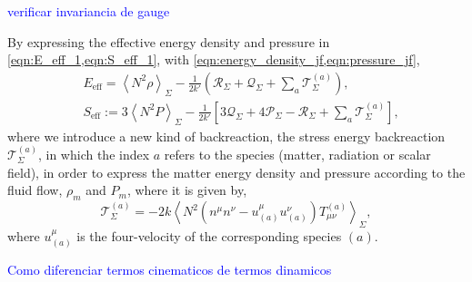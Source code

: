 \textcolor{blue}{verificar invariancia de gauge}







By expressing the effective energy density and pressure in \cref{eqn:E_eff_1,eqn:S_eff_1}, with \cref{eqn:energy_density_jf,eqn:pressure_jf},
\begin{align}
    &E_{\mathrm{eff}} = \left\langle N^2 \rho\right\rangle_{\Sigma}-\frac{1}{2k'}\left(\mathcal{R}_\Sigma+\mathcal{Q}_{\Sigma}+\sum_a \mathcal{T}^{(a)}_{\Sigma}\right),\\
    &S_{\mathrm{eff}}:=3\left\langle N^2 P\right\rangle_{\Sigma}-\frac{1}{2k'}\left[3\mathcal{Q}_{\Sigma}+4\mathcal{P}_{\Sigma}-\mathcal{R}_\Sigma+\sum_a\mathcal{T}^{(a)}_{\Sigma}\right],
\end{align}
where we introduce a new kind of backreaction, the stress energy backreaction $\mathcal{T}^{(a)}_\Sigma$, in which the index $a$ refers to the species (matter, radiation or scalar field), in order to express the matter energy density and pressure according to the fluid flow, $\rho_m$ and $P_m$, where it is given by,
\begin{equation}
    \mathcal{T}^{(a)}_{\Sigma}=-2k\left\langle N^2\left(n^\mu n^\nu-u^\mu_{(a)} u^\nu_{(a)}\right)T_{\mu\nu}^{(a)}\right\rangle_\Sigma,
\end{equation}
where $u_{(a)}^\mu$ is the four-velocity of the corresponding species $(a)$.



\textcolor{blue}{Como diferenciar termos cinematicos de termos dinamicos}





